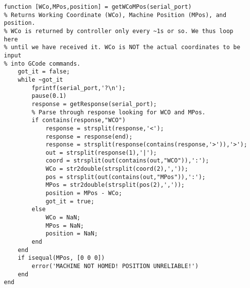 \begin{lstlisting}
function [WCo,MPos,position] = getWCoMPos(serial_port)
% Returns Working Coordinate (WCo), Machine Position (MPos), and position.
% WCo is returned by controller only every ~1s or so. We thus loop here
% until we have received it. WCo is NOT the actual coordinates to be input
% into GCode commands.
    got_it = false;
    while ~got_it
        fprintf(serial_port,'?\n');
        pause(0.1)
        response = getResponse(serial_port);
		% Parse through response looking for WCO and MPos.
        if contains(response,"WCO")
            response = strsplit(response,'<');
            response = response(end);
            response = strsplit(response(contains(response,'>')),'>');
            out = strsplit(response(1),'|');
            coord = strsplit(out(contains(out,"WCO")),':');
            WCo = str2double(strsplit(coord(2),','));
            pos = strsplit(out(contains(out,"MPos")),':');
            MPos = str2double(strsplit(pos(2),','));
            position = MPos - WCo;
            got_it = true;
        else
            WCo = NaN;
            MPos = NaN;
            position = NaN;
        end
    end
    if isequal(MPos, [0 0 0])
        error('MACHINE NOT HOMED! POSITION UNRELIABLE!')
    end
end

\end{lstlisting}